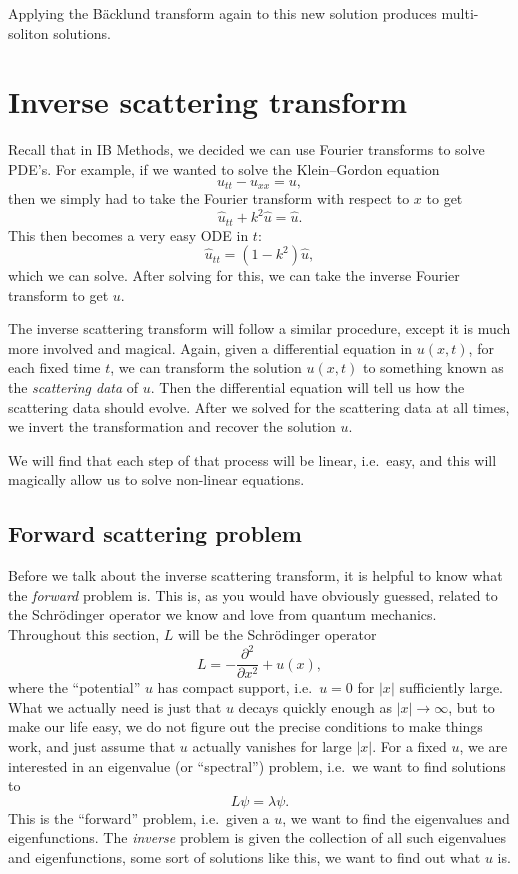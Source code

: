 \documentclass[a4paper]{article}
\begin{document}
\begin{eg}
  Applying the B\"acklund transform again to this new solution produces multi-soliton solutions.
\end{eg}

\section{Inverse scattering transform}
Recall that in IB Methods, we decided we can use Fourier transforms to solve PDE's. For example, if we wanted to solve the Klein--Gordon equation
\[
  u_{tt} - u_{xx} = u,
\]
then we simply had to take the Fourier transform with respect to $x$ to get
\[
  \hat{u}_{tt} + k^2 \hat{u} = \hat{u}.
\]
This then becomes a very easy ODE in $t$:
\[
  \hat{u}_{tt} = (1 - k^2) \hat{u},
\]
which we can solve. After solving for this, we can take the inverse Fourier transform to get $u$.

The inverse scattering transform will follow a similar procedure, except it is much more involved and magical. Again, given a differential equation in $u(x, t)$, for each fixed time $t$, we can transform the solution $u(x, t)$ to something known as the \emph{scattering data} of $u$. Then the differential equation will tell us how the scattering data should evolve. After we solved for the scattering data at all times, we invert the transformation and recover the solution $u$.

We will find that each step of that process will be linear, i.e.\ easy, and this will magically allow us to solve non-linear equations.
\subsection{Forward scattering problem}
Before we talk about the inverse scattering transform, it is helpful to know what the \emph{forward} problem is. This is, as you would have obviously guessed, related to the Schr\"odinger operator we know and love from quantum mechanics. Throughout this section, $L$ will be the Schr\"odinger operator
\[
  L = -\frac{\partial^2}{\partial x^2} + u(x),
\]
where the ``potential'' $u$ has compact support, i.e.\ $u = 0$ for $|x|$ sufficiently large. What we actually need is just that $u$ decays quickly enough as $|x| \to \infty$, but to make our life easy, we do not figure out the precise conditions to make things work, and just assume that $u$ actually vanishes for large $|x|$. For a fixed $u$, we are interested in an eigenvalue (or ``spectral'') problem, i.e.\ we want to find solutions to
\[
  L \psi = \lambda \psi.
\]
This is the ``forward'' problem, i.e.\ given a $u$, we want to find the eigenvalues and eigenfunctions. The \emph{inverse} problem is given the collection of all such eigenvalues and eigenfunctions, some sort of solutions like this, we want to find out what $u$ is.
\end{document}
